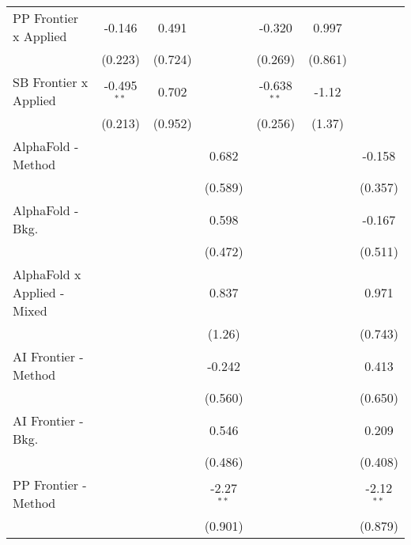 \begin{tabular}{lcccccc}
   PP Frontier x Applied          & -0.146        & 0.491         &              & -0.320        & 0.997         &   \\   
                                  & (0.223)       & (0.724)       &              & (0.269)       & (0.861)       &   \\   
   SB Frontier x Applied          & -0.495$^{**}$ & 0.702         &              & -0.638$^{**}$ & -1.12         &   \\   
                                  & (0.213)       & (0.952)       &              & (0.256)       & (1.37)        &   \\   
   AlphaFold - Method             &               &               & 0.682        &               &               & -0.158\\   
                                  &               &               & (0.589)      &               &               & (0.357)\\   
   AlphaFold - Bkg.               &               &               & 0.598        &               &               & -0.167\\   
                                  &               &               & (0.472)      &               &               & (0.511)\\   
   AlphaFold x Applied - Mixed    &               &               & 0.837        &               &               & 0.971\\   
                                  &               &               & (1.26)       &               &               & (0.743)\\   
   AI Frontier - Method           &               &               & -0.242       &               &               & 0.413\\   
                                  &               &               & (0.560)      &               &               & (0.650)\\   
   AI Frontier - Bkg.             &               &               & 0.546        &               &               & 0.209\\   
                                  &               &               & (0.486)      &               &               & (0.408)\\   
   PP Frontier - Method           &               &               & -2.27$^{**}$ &               &               & -2.12$^{**}$\\   
                                  &               &               & (0.901)      &               &               & (0.879)\\   

\end{tabular}
